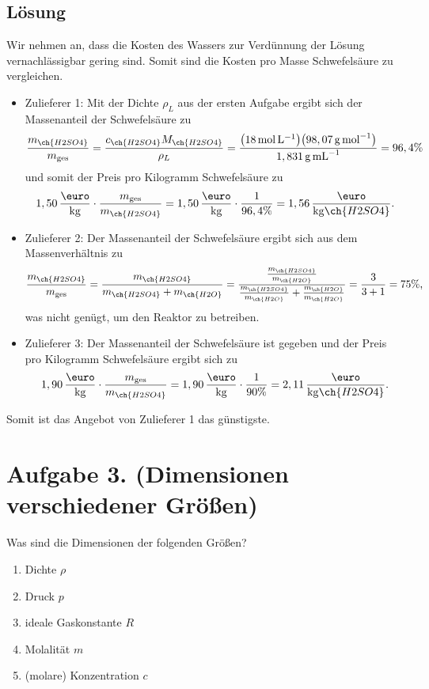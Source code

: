 \documentclass[german,12pt]{homework}
\DeclarePairedDelimiter{\enbrace}{(}{)}
\newcommand{\sis}[1]{\,\si{#1}}
\begin{document}
    \subsection*{Lösung} Wir nehmen an, dass die Kosten des Wassers zur
    Verdünnung der Lösung vernachlässigbar gering sind. Somit sind die Kosten
    pro Masse Schwefelsäure zu vergleichen.
    \begin{itemize}
        \item Zulieferer 1: Mit der Dichte \(\rho_L\) aus der ersten Aufgabe
        ergibt sich der Massenanteil der Schwefelsäure zu
        \[\frac{m_{\ch{H2SO4}}}{m_\text{ges}} = \frac{c_{\ch{H2SO4}}M_{\ch{H2SO4}}}{\rho_L} = \frac{\enbrace*{18\sis{\mole\per\liter}}\enbrace*{98,07
        \sis{\gram\per\mole}}}{1,831\sis{\gram\per\milli\liter}} = 96,4\%\]
        und somit der Preis pro Kilogramm Schwefelsäure zu
        \[1,50\,\frac{\text{\euro}}{\si{\kilogram}} \cdot \frac{m_\text{ges}}{m_{\ch{H2SO4}}} = 1,50\,\frac{\text{\euro}}
        {\si{\kilogram}} \cdot \frac{1}{96,4\%} = 1,56\,\frac{\text{\euro}}
        {\si{\kilogram}\ch{H2SO4}}.\]
        \item Zulieferer 2: Der Massenanteil der Schwefelsäure ergibt sich aus
        dem Massenverhältnis zu
        \[\frac{m_{\ch{H2SO4}}}{m_\text{ges}} = \frac{m_{\ch{H2SO4}}}
        {m_{\ch{H2SO4}} + m_{\ch{H2O}}} = \frac{\frac{m_{\ch{H2SO4}}}
        {m_{\ch{H2O}}}}{\frac{m_{\ch{H2SO4}}}{m_{\ch{H2O}}} +
        \frac{m_{\ch{H2O}}}{m_{\ch{H2O}}}} = \frac{3}{3 + 1} = 75\%,\]
        was nicht genügt, um den Reaktor zu betreiben.
        \item Zulieferer 3: Der Massenanteil der Schwefelsäure ist gegeben und
        der Preis pro Kilogramm Schwefelsäure ergibt sich zu
        \[1,90\,\frac{\text{\euro}}{\si{\kilogram}} \cdot \frac{m_\text{ges}}
        {m_{\ch{H2SO4}}} = 1,90\,\frac{\text{\euro}}{\si{\kilogram}} \cdot
        \frac{1}{90\%} = 2,11\,\frac{\text{\euro}}{\si{\kilogram}\ch{H2SO4}}.\]
    \end{itemize}
    Somit ist das Angebot von Zulieferer 1 das günstigste.

    \section*{Aufgabe 3. (Dimensionen verschiedener Größen)}

    \begin{problem}
        Was sind die Dimensionen der folgenden Größen?
        \begin{enumerate}
            \item Dichte \(\rho\)
            \item Druck \(p\)
            \item ideale Gaskonstante \(R\)
            \item Molalität \(m\)
            \item (molare) Konzentration \(c\)
        \end{enumerate}
    \end{problem}
\end{document}
